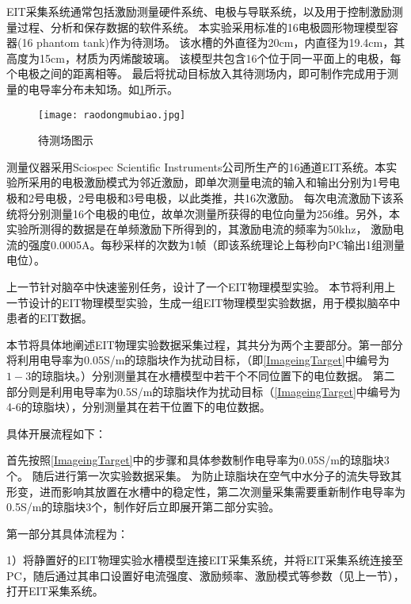 EIT采集系统通常包括激励测量硬件系统、电极与导联系统，以及用于控制激励测量过程、分析和保存数据的软件系统。
本实验采用标准的16电极圆形物理模型容器(16 phantom tank)作为待测场。
该水槽的外直径为20cm，内直径为19.4cm，其高度为15cm，材质为丙烯酸玻璃。
该模型共包含16个位于同一平面上的电极，每个电极之间的距离相等。
最后将扰动目标放入其待测场内，即可制作完成用于测量的电导率分布未知场。如\cref{figure:raodongmubiao}所示。
\begin{figure}[H]
    \centering
    \texttt{[image: raodongmubiao.jpg]}
    \caption{待测场图示}
    \label{figure:raodongmubiao}
\end{figure}
测量仪器采用Sciospec Scientific Instruments公司所生产的16通道EIT系统。本实验所采用的电极激励模式为邻近激励，即单次测量电流的输入和输出分别为1号电极和2号电极，2号电极和3号电极，以此类推，共16次激励。
每次电流激励下该系统将分别测量16个电极的电位，故单次测量所获得的电位向量为256维。另外，本实验所测得的数据是在单频激励下所得到的，其激励电流的频率为50khz，
激励电流的强度0.0005A。每秒采样的次数为1帧（即该系统理论上每秒向PC输出1组测量电位）。




上一节针对脑卒中快速鉴别任务，设计了一个EIT物理模型实验。
本节将利用上一节设计的EIT物理模型实验，生成一组EIT物理模型实验数据，用于模拟脑卒中患者的EIT数据。



本节将具体地阐述EIT物理实验数据采集过程，其共分为两个主要部分。第一部分将利用电导率为0.05S/m的琼脂块作为扰动目标，（即\cref{ImageingTarget}中编号为$1-3$的琼脂块。）分别测量其在水槽模型中若干个不同位置下的电位数据。
第二部分则是利用电导率为0.5S/m的琼脂块作为扰动目标（\cref{ImageingTarget}中编号为4-6的琼脂块），分别测量其在若干位置下的电位数据。

具体开展流程如下：

首先按照\cref{ImageingTarget}中的步骤和具体参数制作电导率为0.05S/m的琼脂块3个。
随后进行第一次实验数据采集。
为防止琼脂块在空气中水分子的流失导致其形变，进而影响其放置在水槽中的稳定性，第二次测量采集需要重新制作电导率为0.5S/m的琼脂块3个，制作好后立即展开第二部分实验。

第一部分其具体流程为：

     1）将静置好的EIT物理实验水槽模型连接EIT采集系统，并将EIT采集系统连接至PC，随后通过其串口设置好电流强度、激励频率、激励模式等参数（见上一节），打开EIT采集系统。

